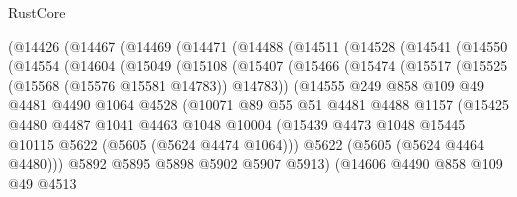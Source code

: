 \begin{lexlean}{RustCore}
\begin{coremodule}
    (@14426
      (@14467
        (@14469
          (@14471
            (@14488
              (@14511
                (@14528
                  (@14541
                    (@14550
                      (@14554
                        (@14604
                          (@15049
                            (@15108
                              (@15407
                                (@15466
                                  (@15474
                                    (@15517 (@15525 (@15568 (@15576 @15581 @14783)) @14783))
                                    (@14555
                                      @249
                                      @858
                                      @109
                                      @49
                                      @4481
                                      @4490
                                      @1064
                                      @4528
                                      (@10071
                                        @89
                                        @55
                                        @51
                                        @4481
                                        @4488
                                        @1157
                                        (@15425
                                          @4480
                                          @4487
                                          @1041
                                          @4463
                                          @1048
                                          @10004
                                          (@15439
                                            @4473
                                            @1048
                                            @15445
                                            @10115
                                            @5622
                                            (@5605 (@5624 @4474 @1064)))
                                          @5622
                                          (@5605 (@5624 @4464 @4480)))
                                        @5892
                                        @5895
                                        @5898
                                        @5902
                                        @5907
                                        @5913)
                                      (@14606
                                        @4490
                                        @858
                                        @109
                                        @49
                                        @4513

\end{coremodule}
\end{lexlean}
